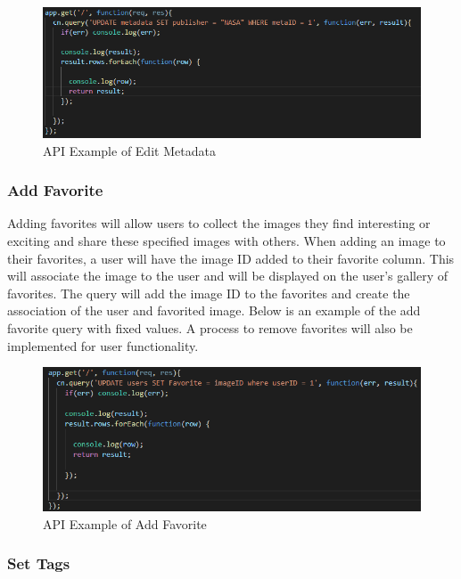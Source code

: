 \documentclass[12pt]{article}
\begin{document}
\begin{figure}[h]
	\centering
	\includegraphics[scale=0.5]{api_edit_metadata}
	\caption{API Example of Edit Metadata}
	\label{fig:API Edit Metadata}
\end{figure}

\subsubsection{Add Favorite}

Adding favorites will allow users to collect the images they find interesting or exciting and share these specified images with others.  When adding an image to their favorites, a user will have the image ID added to their favorite column.  This will associate the image to the user and will be displayed on the user’s gallery of favorites.  The query will add the image ID to the favorites and create the association of the user and favorited image.  Below is an example of the add favorite query with fixed values.  A process to remove favorites will also be implemented for user functionality.

\begin{figure}[h]
	\centering
	\includegraphics[scale=0.5]{api_add_favorite}
	\caption{API Example of Add Favorite}
	\label{fig:API Add Favorite}
\end{figure}

\subsubsection{Set Tags}
\end{document}
